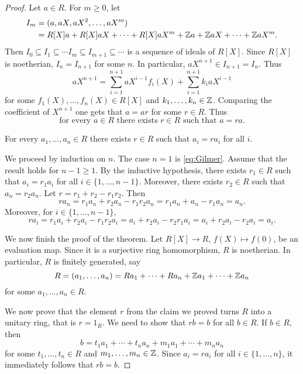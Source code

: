 \begin{proof}
    Let $a\in R$. For $m\geq0$, let
    \begin{align*}
    I_m&=(a,aX,aX^2,\dots,aX^m)\\
    &=R[X]a+R[X]aX+\cdots+R[X]aX^m+\mathbb{Z} a+\mathbb{Z} aX+\cdots+\mathbb{Z} aX^m.
    \end{align*}
    Then $I_0\subseteq I_1\subseteq\cdots I_m\subseteq I_{m+1}\subseteq\cdots$ 
    is a sequence of ideals of $R[X]$. Since $R[X]$ is noetherian,
    $I_n=I_{n+1}$ for some $n$. In particular, 
    $aX^{n+1}\in I_{n+1}=I_n$. Thus
    \[
    aX^{n+1}=\sum_{i=1}^{n+1} aX^{i-1}f_i(X)+\sum_{i=1}^{n+1} k_iaX^{i-1}
    \]
    for some $f_1(X),\dots,f_n(X)\in R[X]$ and 
    $k_1,\dots,k_n\in\mathbb{Z}$. Comparing the coefficient of $X^{n+1}$ 
    one gets that $a=ar$ for some $r\in R$. 
    Thus  
    \begin{equation}
        \label{eq:Gilmer}
        \text{for every $a\in R$ there exists $r\in R$ 
    such that $a=ra$.}
    \end{equation}
    
    \begin{claim}
        For every $a_1,\dots,a_n\in R$ there exists $r\in R$ 
        such that $a_i=ra_i$ for all $i$. 
    \end{claim}
    
    We proceed by induction on $n$. 
    The case $n=1$ is \eqref{eq:Gilmer}. Assume 
    that the result holds for $n-1\geq1$. By the inductive hypothesis, 
    there exists $r_1\in R$ such that $a_i=r_1a_i$ 
    for all $i\in\{1,\dots,n-1\}$. Moreover, 
    there exists $r_2\in R$ such that $a_n=r_2a_n$. 
    Let $r=r_1+r_2-r_1r_2$. Then
    \[
    ra_n=r_1a_n+r_2a_n-r_1r_2a_n=r_1a_n+a_n-r_1a_n=a_n.
    \]
    Moreover, for $i\in\{1,\dots,n-1\}$, 
    \[
    ra_i=r_1a_i+r_2a_i-r_1r_2a_i=a_i+r_2a_i-r_2r_1a_i=a_i+r_2a_i-r_2a_i=a_i.
    \]
    
    We now finish the proof of the theorem. 
    Let $R[X]\to R$, $f(X)\mapsto f(0)$, be an evaluation map. Since
    it is a surjective ring homomorphism, 
    $R$ is noetherian. In particular, $R$ is finitely generated, 
    say 
    \[
    R=(a_1,\dots,a_n)=Ra_1+\cdots+Ra_n+\mathbb{Z} a_1+\cdots+\mathbb{Z} a_n
    \]
    for some $a_1,\dots,a_n\in R$. 
    
    We now prove that the element $r$ from the claim we proved turns 
    $R$ into a unitary ring, that is $r=1_R$.  
    We need to show that $rb=b$ for all $b\in R$. 
    If $b\in R$, then 
    \[
    b=t_1a_1+\cdots+t_na_n+m_1a_1+\cdots+m_na_n
    \]
    for some $t_1,\dots,t_n\in R$ and $m_1,\dots,m_n\in\mathbb{Z}$. 
    Since $a_i=ra_i$ for all $i\in\{1,\dots,n\}$, it immediately
    follows that
    $rb=b$. 
\end{proof}

